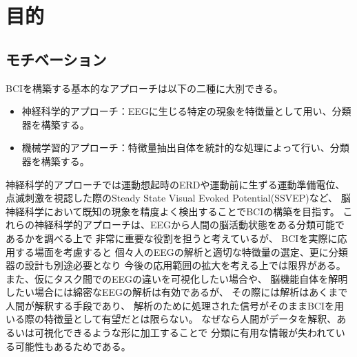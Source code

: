 \section{\mc 目的}
\subsection{\mc モチベーション}
BCIを構築する基本的なアプローチは以下の二種に大別できる。
\begin{itemize}
    \item 神経科学的アプローチ：EEGに生じる特定の現象を特徴量として用い、分類器を構築する。
    \item 機械学習的アプローチ：特徴量抽出自体を統計的な処理によって行い、分類器を構築する。
\end{itemize}
神経科学的アプローチでは運動想起時のERDや運動前に生ずる運動準備電位、
点滅刺激を視認した際のSteady State Visual Evoked Potential(SSVEP)など、
脳神経科学において既知の現象を精度よく検出することでBCIの構築を目指す。
これらの神経科学的アプローチは、EEGから人間の脳活動状態をある分類可能であるかを調べる上で
非常に重要な役割を担うと考えているが、
BCIを実際に応用する場面を考慮すると
個々人のEEGの解析と適切な特徴量の選定、更に分類器の設計も別途必要となり
今後の応用範囲の拡大を考える上では限界がある。
また、仮にタスク間でのEEGの違いを可視化したい場合や、
脳機能自体を解明したい場合には綿密なEEGの解析は有効であるが、
その際には解析はあくまで人間が解釈する手段であり、
解析のために処理された信号がそのままBCIを用いる際の特徴量として有望だとは限らない。
なぜなら人間がデータを解釈、あるいは可視化できるような形に加工することで
分類に有用な情報が失われている可能性もあるためである。

